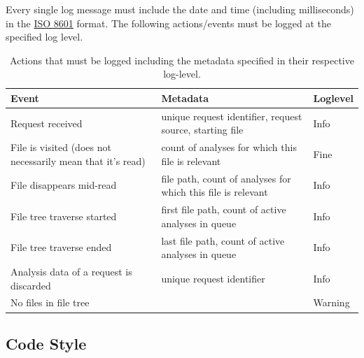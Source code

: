 \documentclass[11pt]{article} %
\begin{document}
    Every single log message must include the date and time (including milliseconds) in the \href{https://en.wikipedia.org/wiki/ISO_8601}{ISO 8601} format. The following actions/events must be logged at the specified log level.

    \begin{table}[H]
        \centering
        \begin{tabular}{p{.2\linewidth} | p{.5\linewidth} | p{.2\linewidth}}
            \textbf{Event}                                             & \textbf{Metadata}                                            & \textbf{Loglevel} \\\hline
            Request received                                           & unique request identifier, request source, starting file     & Info              \\\hline
            File is visited (does not necessarily mean that it's read) & count of analyses for which this file is relevant                     & Fine              \\\hline
            File disappears mid-read                                   & file path, count of analyses for which this file is relevant                     & Info              \\\hline
            File tree traverse started                                 & first file path, count of active analyses in queue           & Info              \\\hline
            File tree traverse ended                                   & last file path, count of active analyses in queue            & Info              \\\hline
            Analysis data of a request is discarded                    & unique request identifier                                    & Info              \\\hline
            No files in file tree                                      &                                                              & Warning
        \end{tabular}
        \caption{Actions that must be logged including the metadata specified in their respective log-level.}
        \label{tab:log_actions}
    \end{table}


    \subsection{Code Style}\label{sec:3.4}
\end{document}
